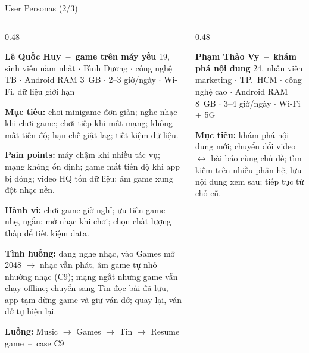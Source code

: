 \documentclass[aspectratio=169]{beamer}
\begin{document}
\begin{frame}{User Personas (2/3)}
  \begin{columns}
    \begin{column}{0.48\textwidth}
      \begin{block}{\scriptsize\bfseries Lê Quốc Huy~--~game trên máy yếu}
        {\tiny\color{brandgray} 19, sinh viên năm nhất $\cdot$ Bình Dương $\cdot$ công nghệ TB $\cdot$ Android RAM 3~GB $\cdot$ 2--3 giờ/ngày $\cdot$ Wi-Fi, dữ liệu giới hạn}\par\vspace{0.6mm}
        {\tiny\textbf{Mục tiêu:} chơi minigame đơn giản; nghe nhạc khi chơi game; chơi tiếp khi mất mạng; không mất tiến độ; hạn chế giật lag; tiết kiệm dữ liệu.}\par\vspace{0.3mm}
        {\tiny\textbf{Pain points:} máy chậm khi nhiều tác vụ; mạng không ổn định; game mất tiến độ khi app bị đóng; video HQ tốn dữ liệu; âm game xung đột nhạc nền.}\par\vspace{0.3mm}
        {\tiny\textbf{Hành vi:} chơi game giờ nghỉ; ưu tiên game nhẹ, ngắn; mở nhạc khi chơi; chọn chất lượng thấp để tiết kiệm data.}\par\vspace{0.3mm}
        {\tiny\textbf{Tình huống:} đang nghe nhạc, vào Games mở 2048 $\rightarrow$ nhạc vẫn phát, âm game tự nhỏ nhường nhạc (C9); mạng ngắt nhưng game vẫn chạy offline; chuyển sang Tin đọc bài đã lưu, app tạm dừng game và giữ ván dở; quay lại, ván dở tự hiện lại.}\par\vspace{0.3mm}
        {\tiny\textbf{Luồng:} \textcolor{brandteal!60!black}{Music $\rightarrow$ Games $\rightarrow$ Tin $\rightarrow$ Resume game}~--~case C9}
      \end{block}
    \end{column}
    \begin{column}{0.48\textwidth}
      \begin{block}{\scriptsize\bfseries Phạm Thảo Vy~--~khám phá nội dung}
        {\tiny\color{brandgray} 24, nhân viên marketing $\cdot$ TP.\ HCM $\cdot$ công nghệ cao $\cdot$ Android RAM 8~GB $\cdot$ 3--4 giờ/ngày $\cdot$ Wi-Fi + 5G}\par\vspace{0.6mm}
        {\tiny\textbf{Mục tiêu:} khám phá nội dung mới; chuyển đổi video $\leftrightarrow$ bài báo cùng chủ đề; tìm kiếm trên nhiều phân hệ; lưu nội dung xem sau; tiếp tục từ chỗ cũ.}\par\vspace{0.3mm}

\end{block}
\end{column}
\end{columns}
\end{frame}
\end{document}

